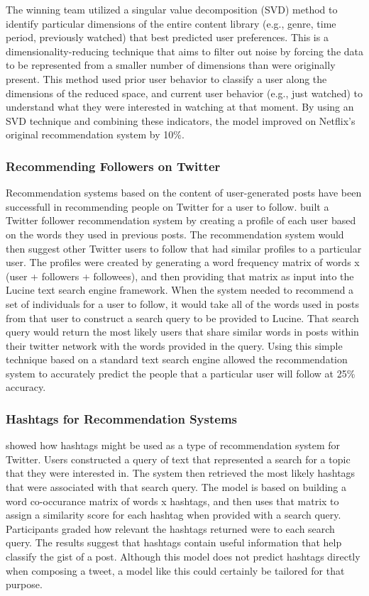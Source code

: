 \documentclass[man]{apa6}
\begin{document}
The winning team utilized a singular value decomposition (SVD) method to identify particular dimensions of the entire content library (e.g., genre, time period, previously watched) that best predicted user preferences.
This is a dimensionality-reducing technique that aims to filter out noise by forcing the data to be represented from a smaller number of dimensions than were originally present.
This method used prior user behavior to classify a user along the dimensions of the reduced space, and current user behavior (e.g., just watched) to understand what they were interested in watching at that moment.
By using an SVD technique and combining these indicators, the model improved on Netflix's original recommendation system by 10\%.

\subsubsection{Recommending Followers on Twitter}

Recommendation systems based on the content of user-generated posts have been successfull in recommending people on Twitter for a user to follow.
\textcite{Hannon2010} built a Twitter follower recommendation system by creating a profile of each user based on the words they used in previous posts.
The recommendation system would then suggest other Twitter users to follow that had similar profiles to a particular user.
The profiles were created by generating a word frequency matrix of words x (user + followers + followees), and then providing that matrix as input into the Lucine text search engine framework.
When the system needed to recommend a set of individuals for a user to follow, it would take all of the words used in posts from that user to construct a search query to be provided to Lucine.
That search query would return the most likely users that share similar words in posts within their twitter network with the words provided in the query.
Using this simple technique based on a standard text search engine allowed the recommendation system to accurately predict the people that a particular user will follow at 25\% accuracy.

\subsubsection{Hashtags for Recommendation Systems}

\textcite{Efron2010} showed how hashtags might be used as a type of recommendation system for Twitter.
Users constructed a query of text that represented a search for a topic that they were interested in.
The system then retrieved the most likely hashtags that were associated with that search query.
The model is based on building a word co-occurance matrix of words x hashtags, and then uses that matrix to assign a similarity score for each hashtag when provided with a search query.
Participants graded how relevant the hashtags returned were to each search query.
The results suggest that hashtags contain useful information that help classify the gist of a post. 
Although this model does not predict hashtags directly when composing a tweet, a model like this could certainly be tailored for that purpose.
\end{document}
